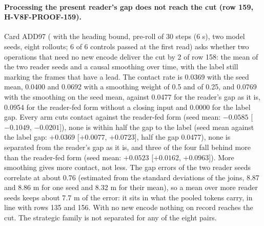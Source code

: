 \paragraph{Processing the present reader's gap does not reach the cut (row 159, H-V8F-PROOF-159).} Card ADD97 ( with the heading bound, pre-roll of 30 steps (6 s), two model seeds, eight rollouts; 6 of 6 controls passed at the first read) asks whether two operations that need no new encode deliver the cut by 2 of row 158: the mean of the two reader seeds and a causal smoothing over time, with the label still marking the frames that have a lead. The contact rate is 0.0369 with the seed mean, 0.0400 and 0.0692 with a smoothing weight of 0.5 and of 0.25, and 0.0769 with the smoothing on the seed mean, against 0.0477 for the reader's gap as it is, 0.0954 for the reader-fed form without a closing input and 0.0000 for the label gap. Every arm cuts contact against the reader-fed form (seed mean: $-0.0585$ [$-0.1049$, $-0.0201$]), none is within half the gap to the label (seed mean against the label gap: $+0.0369$ [$+0.0077$, $+0.0723$], half the gap 0.0477), none is separated from the reader's gap as it is, and three of the four fall behind more than the reader-fed form (seed mean: $+0.0523$ [$+0.0162$, $+0.0963$]). More smoothing gives more contact, not less. The gap errors of the two reader seeds correlate at about 0.76 (estimated from the standard deviations of the joins, 8.87 and 8.86 m for one seed and 8.32 m for their mean), so a mean over more reader seeds keeps about 7.7 m of the error: it sits in what the pooled tokens carry, in line with rows 135 and 156. With no new encode nothing on record reaches the cut. The strategic family is not separated for any of the eight pairs.

